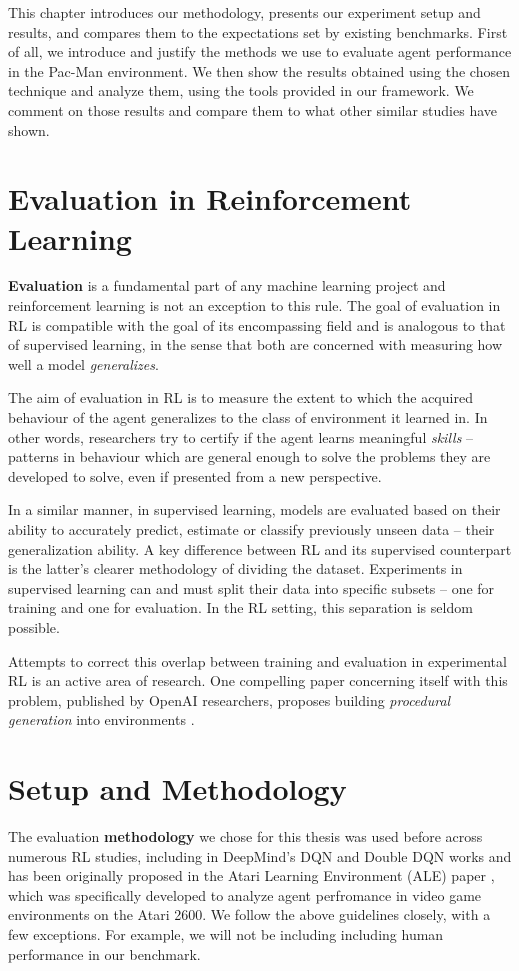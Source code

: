 This chapter introduces our methodology, presents our experiment setup and results, and compares them to the expectations set by existing benchmarks.
First of all, we introduce and justify the methods we use to evaluate agent performance in the Pac-Man environment.
We then show the results obtained using the chosen technique and analyze them, using the tools provided in our framework.
We comment on those results and compare them to what other similar studies have shown.

\section*{Evaluation in Reinforcement Learning}
\textbf{Evaluation} is a fundamental part of any machine learning project and reinforcement learning is not an exception to this rule.
The goal of evaluation in RL is compatible with the goal of its encompassing field and is analogous to that of supervised learning, in the sense that both are concerned with measuring how well a model \emph{generalizes}.

The aim of evaluation in RL is to measure the extent to which the acquired behaviour of the agent generalizes to the class of environment it learned in.
In other words, researchers try to certify if the agent learns meaningful \emph{skills} -- patterns in behaviour which are general enough to solve the problems they are developed to solve, even if presented from a new perspective.

In a similar manner, in supervised learning, models are evaluated based on their ability to accurately predict, estimate or classify previously unseen data -- their generalization ability.
A key difference between RL and its supervised counterpart is the latter's clearer methodology of dividing the dataset.
Experiments in supervised learning can and must split their data into specific subsets -- one for training and one for evaluation. In the RL setting, this separation is seldom possible.

Attempts to correct this overlap between training and evaluation in experimental RL is an active area of research.
One compelling paper concerning itself with this problem, published by OpenAI researchers, proposes building \emph{procedural generation} into environments \cite{procgen-paper}.
\vfill %

\section*{Setup and Methodology}
The evaluation \textbf{methodology} we chose for this thesis was used before across numerous RL studies, including in DeepMind's DQN and Double DQN works \cite{atari-dqn,ddqn-paper} and has been originally proposed in the Atari Learning Environment (ALE) paper \cite{ale-paper}, which was specifically developed to analyze agent perfromance in video game environments on the Atari 2600.
We follow the above guidelines closely, with a few exceptions.
For example, we will not be including including human performance in our benchmark.


